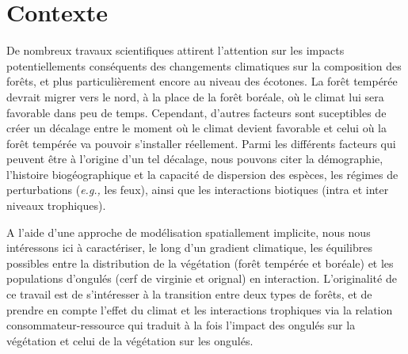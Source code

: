 




\section{Contexte}

De nombreux travaux scientifiques attirent l'attention sur les impacts
potentiellements conséquents des changements climatiques sur la composition
des forêts, et plus particulièrement encore au niveau des écotones. La forêt
tempérée devrait migrer vers le nord, à la place de la forêt boréale, où le
climat lui sera favorable dans peu de temps. Cependant, d'autres facteurs sont
suceptibles de créer un décalage entre le moment où le climat devient
favorable et celui où la forêt tempérée va pouvoir s'installer réellement.
Parmi les différents facteurs qui peuvent être à l'origine d'un tel décalage,
nous pouvons citer la démographie, l'histoire biogéographique et la capacité
de dispersion des espèces, les régimes de perturbations (\textit{e.g.,} les
feux), ainsi que les interactions biotiques (intra et inter niveaux
trophiques).

\vspace{1em}

\noindent A l'aide d'une approche de modélisation spatiallement implicite, nous nous
intéressons ici à caractériser, le long d'un gradient climatique, les
équilibres possibles entre la distribution de la végétation (forêt tempérée et
boréale) et les populations d'ongulés (cerf de virginie et orignal) en
interaction. L'originalité de ce travail est de s'intéresser à la transition
entre deux types de forêts, et de prendre en compte l'effet du climat et les
interactions trophiques via la relation consommateur-ressource qui traduit à
la fois l'impact des ongulés sur la végétation et celui de la végétation sur
les ongulés.





